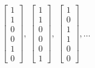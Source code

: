 \documentclass[11pt]{article}\usepackage[]{graphicx}\usepackage[]{color}
\theoremstyle{newstyle}
\begin{document}
\begin{align*}
 \begin{bmatrix} 1 \\ 1 \\ 0 \\ 0 \\ 1 \\ 0 \end{bmatrix}, \ \begin{bmatrix} 1 \\ 1 \\ 0 \\ 0 \\ 0 \\ 1 \end{bmatrix}, \ \begin{bmatrix} 1 \\ 0 \\ 1 \\ 1 \\ 0 \\ 0 \end{bmatrix}, \dots %
\end{align*}
\end{document}
